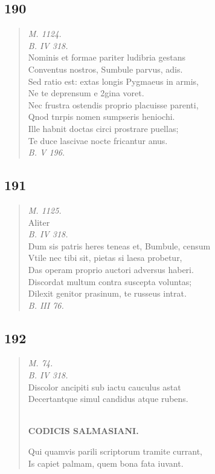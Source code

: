 \documentclass[11pt, a4paper]{report}
\begin{document}
            \subsection*{190}
      \begin{verse}
      \textit{M. 1124.} \\ \textit{B. IV 318.} \\ Nominis et formae pariter ludibria gestans \\ Conventus nostros, Sumbule parvus, adis. \\ Sed ratio est: extas longis Pygmaeus in armis, \\ Ne te deprensum e 2gina voret. \\ Nec frustra ostendis proprio placuisse parenti, \\ Qnod tnrpis nomen sumpseris heniochi. \\ Ille habnit doctas circi prostrare puellas; \\ Te duce lascivae nocte fricantur anus. \\ \textit{B. V 196.} \\ 
      \end{verse}
  
            \subsection*{191}
      \begin{verse}
      \textit{M. 1125.} \\ Aliter \\ \textit{B. IV 318.} \\ Dum sis patris heres teneas et, Bumbule, censum \\ Vtile nec tibi sit, pietas si laesa probetur, \\ Das operam proprio auctori adversus haberi. \\ Discordat multum contra suscepta voluntas; \\ Dilexit genitor prasinum, te russeus intrat. \\ \textit{B. III 76.} \\ 
      \end{verse}
  
            \subsection*{192}
      \begin{verse}
      \textit{M. 74.} \\ \textit{B. IV 318.} \\ Discolor ancipiti sub iactu cauculus astat \\ Decertantque simul candidus atque rubens. \\ 
        ﻿\pagebreak 
    \begin{center} \textbf{CODICIS SALMASIANI.} \end{center} \marginpar{[159]} Qui quamvis parili scriptorum tramite currant, \\ Is capiet palmam, quem bona fata iuvant. \\ 
      \end{verse}
  
\end{document}
